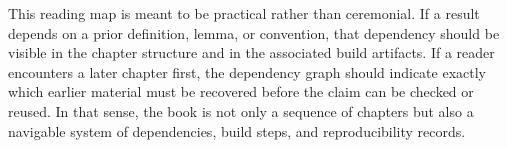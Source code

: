 \documentclass[11pt]{article}
\begin{document}
This reading map is meant to be practical rather than ceremonial. If a result depends on a prior definition, lemma, or convention, that dependency should be visible in the chapter structure and in the associated build artifacts. If a reader encounters a later chapter first, the dependency graph should indicate exactly which earlier material must be recovered before the claim can be checked or reused. In that sense, the book is not only a sequence of chapters but also a navigable system of dependencies, build steps, and reproducibility records.
\end{document}
